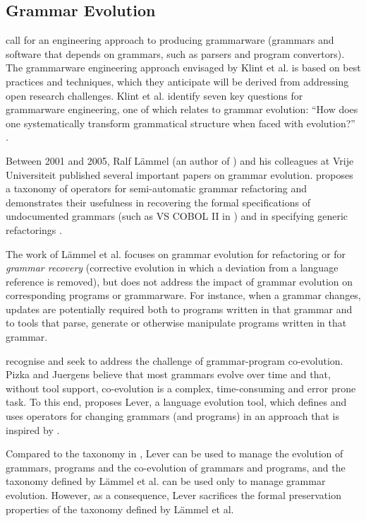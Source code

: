 \subsection{Grammar Evolution}
\label{subsec:grammar_evolution}
\cite{klint03grammarware} call for an engineering approach to producing grammarware (grammars and software that depends on grammars, such as parsers and program convertors). The grammarware engineering approach envisaged by Klint et al. is based on best practices and techniques, which they anticipate will be derived from addressing open research challenges. Klint et al. identify seven key questions for grammarware engineering, one of which relates to grammar evolution: ``How does one systematically transform grammatical structure when faced with evolution?'' \cite[pg. 334]{klint03grammarware}.

Between 2001 and 2005, Ralf L\"{a}mmel (an author of \cite{klint03grammarware}) and his colleagues at Vrije Universiteit published several important papers on grammar evolution. \cite{lammel01grammar_adaptation} proposes a taxonomy of operators for semi-automatic grammar refactoring and demonstrates their usefulness in recovering the formal specifications of undocumented grammars (such as VS COBOL II in \cite{lammel01semiautomatic}) and in specifying generic refactorings \cite{lammel02towards}. 

The work of L\"{a}mmel et al. focuses on grammar evolution for refactoring or for \emph{grammar recovery} (corrective evolution in which a deviation from a language reference is removed), but does not address the impact of grammar evolution on corresponding programs or grammarware. For instance, when a grammar changes, updates are potentially required both to programs written in that grammar and to tools that parse, generate or otherwise manipulate programs written in that grammar.

\cite{pizka07automating} recognise and seek to address the challenge of grammar-program co-evolution. Pizka and Juergens believe that most grammars evolve over time and that, without tool support, co-evolution is a complex, time-consuming and error prone task. To this end, \cite{pizka07automating} proposes Lever, a language evolution tool, which defines and uses operators for changing grammars (and programs) in an approach that is inspired by \cite{lammel01grammar_adaptation}.

Compared to the taxonomy in \cite{lammel01grammar_adaptation}, Lever can be used to manage the evolution of grammars, programs and the co-evolution of grammars and programs, and the taxonomy defined by L\"{a}mmel et al. can be used only to manage grammar evolution. However, as a consequence, Lever sacrifices the formal preservation properties of the taxonomy defined by L\"{a}mmel et al.


